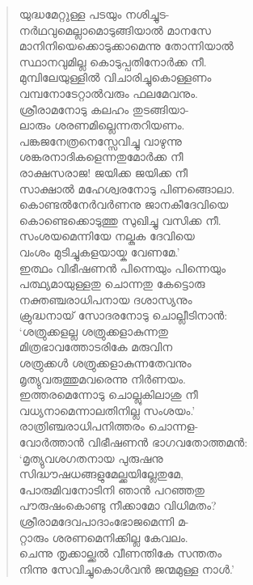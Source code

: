 \begin{verse}
യുദ്ധമേറ്റുള്ള പടയും നശിച്ചുട-\\
നര്‍ഥവുമെല്ലാമൊടുങ്ങിയാല്‍ മാനസേ\\
മാനിനിയെക്കൊടുക്കാമെന്നു തോന്നിയാല്‍\\
സ്ഥാനവുമില്ല കൊടുപ്പതിനോര്‍ക്ക നീ.\\
മുമ്പിലേയുള്ളില്‍ വിചാരിച്ചുകൊള്ളണം\\
വമ്പനോടേറ്റാല്‍വരും ഫലമേവനും.\\
ശ്രീരാമനോടു കലഹം തുടങ്ങിയാ-\\
ലാരും ശരണമില്ലെന്നതറിയണം.\\
പങ്കജനേത്രനെസ്സേവിച്ചു വാഴുന്നു\\
ശങ്കരനാദികളെന്നതുമോര്‍ക്ക നീ\\
രാക്ഷസരാജ! ജയിക്ക ജയിക്ക നീ\\
സാക്ഷാല്‍ മഹേശ്വരനോടു പിണങ്ങൊലാ.\\
കൊണ്ടല്‍നേര്‍വര്‍ണനു ജാനകീദേവിയെ\\
കൊണ്ടെക്കൊടുത്തു സുഖിച്ചു വസിക്ക നീ.\\
സംശയമെന്നിയേ നല്കുക ദേവിയെ\\
വംശം മുടിച്ചുകളയായ്ക വേണമേ.’\\
ഇത്ഥം വിഭീഷണന്‍ പിന്നെയും പിന്നെയും\\
പത്ഥ്യമായുള്ളതു ചൊന്നതു കേട്ടൊരു\\
നക്തഞ്ചരാധിപനായ ദശാസ്യനും\\
ക്രുദ്ധനായ് സോദരനോടു ചൊല്ലീടിനാന്‍:\\
‘ശത്രുക്കളല്ല ശത്രുക്കളാകുന്നതു\\
മിത്രഭാവത്തോടരികേ മരുവിന\\
ശത്രുക്കള്‍ ശത്രുക്കളാകുന്നതേവനും\\
മൃത്യുവരുത്തുമവരെന്നു നിര്‍ണയം.\\
ഇത്തരമെന്നോടു ചൊല്ലുകിലാശു നീ\\
വധ്യനാമെന്നാലതിനില്ല സംശയം.’\\
രാത്രിഞ്ചരാധിപനിത്തരം ചൊന്നള-\\
വോര്‍ത്താന്‍ വിഭീഷണന്‍ ഭാഗവതോത്തമന്‍:\\
‘മൃത്യുവശഗതനായ പുരുഷനു\\
സിദ്ധൗഷധങ്ങളുമേല്ക്കയില്ലേതുമേ,\\
പോരുമിവനോടിനി ഞാന്‍ പറഞ്ഞതു\\
പൗരുഷംകൊണ്ടു നീക്കാമോ വിധിമതം?\\
ശ്രീരാമദേവപാദാംഭോജമെന്നി മ-\\
റ്റാരും ശരണമെനിക്കില്ല കേവലം.\\
ചെന്നു തൃക്കാല്ക്കല്‍ വീണന്തികേ സന്തതം\\
നിന്നു സേവിച്ചുകൊള്‍വന്‍ ജന്മമുള്ള നാള്‍.’\\

\end{verse}
